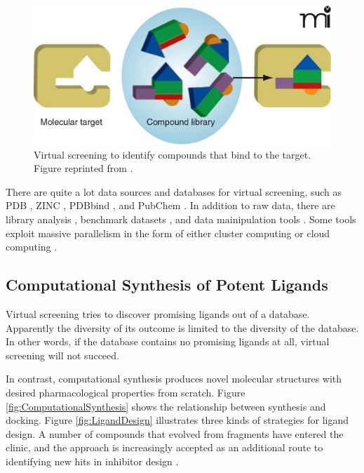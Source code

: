 \begin{figure}
\centering
\includegraphics[width=\textwidth]{Background/Figures/VirtualScreening.png}
\caption{Virtual screening to identify compounds that bind to the target. Figure reprinted from \citep{470-2009}.}
\label{fig:VirtualScreening}
\end{figure}

There are quite a lot data sources and databases for virtual screening, such as PDB \citep{540-2000,539-2000,537-2003,105-2007,538-2008}, ZINC \citep{532-2005}, PDBbind \citep{529-2004,530-2005}, and PubChem \citep{527-2008,526-2009}. In addition to raw data, there are library analysis \citep{521-2009}, benchmark datasets \citep{534-2007,533-2008,535-2010,536-2011}, and data mainipulation tools \citep{542-2010}. Some tools exploit massive parallelism in the form of either cluster computing or cloud computing \citep{557-2009,773-2010,560-2010,782-2011}.

\subsection{Computational Synthesis of Potent Ligands}

Virtual screening tries to discover promising ligands out of a database. Apparently the diversity of its outcome is limited to the diversity of the database. In other words, if the database contains no promising ligands at all, virtual screening will not succeed.

In contrast, computational synthesis produces novel molecular structures with desired pharmacological properties from scratch. Figure \ref{fig:ComputationalSynthesis} shows the relationship between synthesis and docking. Figure \ref{fig:LigandDesign} \citep{363-2005} illustrates three kinds of strategies for ligand design. A number of compounds that evolved from fragments have entered the clinic, and the approach is increasingly accepted as an additional route to identifying new hits in inhibitor design \citep{363-2005,470-2009}.

